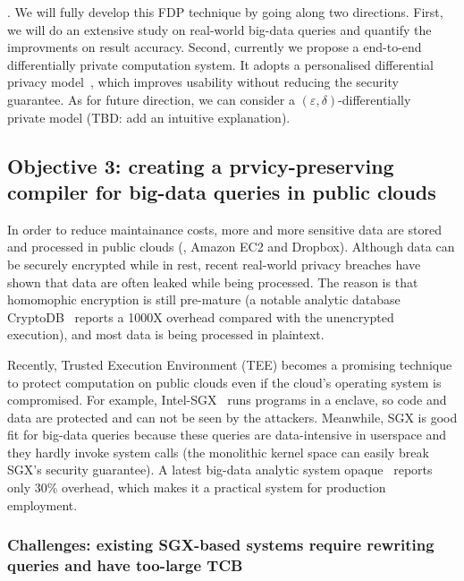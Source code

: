 . We will fully develop this FDP technique by going 
along two directions. First, we will do an extensive study on real-world 
big-data queries and quantify the improvments on result accuracy. Second, 
currently we propose a end-to-end differentially private computation
system. It adopts a personalised differential privacy model~\cite{pdp:icde15},
which improves usability without reducing the security guarantee. As for future 
direction, we can consider a 
$(\varepsilon, \delta)$-differentially~\cite{differntialprivacy:tcc06}
private model (TBD: add an intuitive explanation).


\vspace{-.15in}\subsection{Objective 3: creating a prvicy-preserving compiler 
for big-data queries in public clouds}\label{sec:obj3}\vspace{-.075in}

In order to reduce maintainance costs, more and more sensitive data are stored 
and processed in public clouds (\eg, Amazon EC2 and Dropbox). Although data can 
be securely encrypted while in rest, recent real-world privacy breaches have 
shown that data are often leaked while being processed. The reason is that 
homomophic encryption is still pre-mature (a notable analytic database 
CryptoDB~\cite{cryptdb:sosp11} reports a 1000X overhead compared with
the unencrypted execution), and most data is being processed in plaintext. 

Recently, Trusted Execution Environment (TEE) becomes a promising technique to
protect computation on public clouds even if the cloud's operating system is
compromised. For example, Intel-SGX~\cite{intel-sgx} runs programs
in a enclave, so code and data are protected and can not be seen by the 
attackers. Meanwhile, SGX is good fit for big-data queries because these queries 
are data-intensive in userspace and they hardly invoke system calls (the 
monolithic kernel space can easily break SGX's security guarantee). A latest 
big-data analytic system opaque~\cite{opaque:nsdi17} reports only 30\% overhead, 
which makes it a practical system for production employment.

\vspace{-.15in}
\subsubsection{Challenges: existing SGX-based systems require rewriting 
queries and have too-large TCB} 
\label{sec:ift-problem}\vspace{-.075in}


